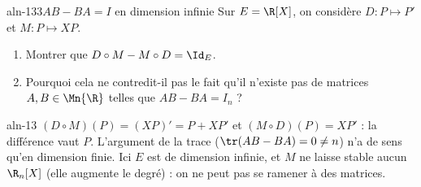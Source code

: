 \begin{exo}{aln-13}{3}{$AB-BA=I$ en dimension infinie}
Sur $E=\R[X]$, on considère $D:P\mapsto P'$ et $M:P\mapsto XP$.
\begin{enumerate}
\item Montrer que $D\circ M-M\circ D=\Id_E$.
\item Pourquoi cela ne contredit-il pas le fait qu'il n'existe pas de matrices $A,B\in\Mn{\R}$ telles que $AB-BA=I_n$ ?
\end{enumerate}
\end{exo}
\begin{corrige}{aln-13}
 $(D\circ M)(P)=(XP)'=P+XP'$ et $(M\circ D)(P)=XP'$ : la différence vaut $P$.
 L'argument de la trace ($\tr(AB-BA)=0\neq n$) n'a de sens qu'en dimension finie. Ici $E$ est de dimension infinie, et $M$ ne
laisse stable aucun $\R_n[X]$ (elle augmente le degré) : on ne peut pas se ramener à des matrices.
\end{corrige}

